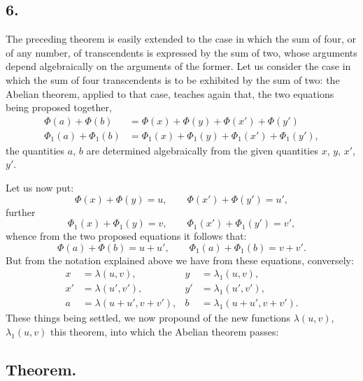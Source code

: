 \documentclass{article}
\begin{document}
\subsection*{6.}

The preceding theorem is easily extended to the case in which the sum of four, or of any number, of transcendents is expressed by the sum of two, whose arguments depend algebraically on the arguments of the former. Let us consider the case in which the sum of four transcendents is to be exhibited by the sum of two: the Abelian theorem, applied to that case, teaches again that, the two equations being proposed together,
\[ \begin{aligned} \Phi(a) + \Phi(b) &= \Phi(x) + \Phi(y) + \Phi(x') + \Phi(y') \\ \Phi_1(a) + \Phi_1(b) &= \Phi_1(x) + \Phi_1(y) + \Phi_1(x') + \Phi_1(y'), \end{aligned} \]
the quantities $a$, $b$ are determined algebraically from the given quantities $x$, $y$, $x'$, $y'$.

Let us now put:
\[ \Phi(x) + \Phi(y) = u, \qquad \Phi(x') + \Phi(y') = u', \]
further
\[ \Phi_1(x) + \Phi_1(y) = v, \qquad \Phi_1(x') + \Phi_1(y') = v', \]
whence from the two proposed equations it follows that:
\[ \Phi(a) + \Phi(b) = u + u', \qquad \Phi_1(a) + \Phi_1(b) = v + v'. \]
But from the notation explained above we have from these equations, conversely:
\[ \begin{aligned} x &= \lambda(u,v), & y &= \lambda_1(u,v), \\ x' &= \lambda(u',v'), & y' &= \lambda_1(u',v'), \\ a &= \lambda(u+u', v+v'), & b &= \lambda_1(u+u', v+v'). \end{aligned} \]
These things being settled, we now propound of the new functions $\lambda(u,v)$, $\lambda_1(u,v)$ this theorem, into which the Abelian theorem passes:

\subsection*{Theorem.}
\end{document}
